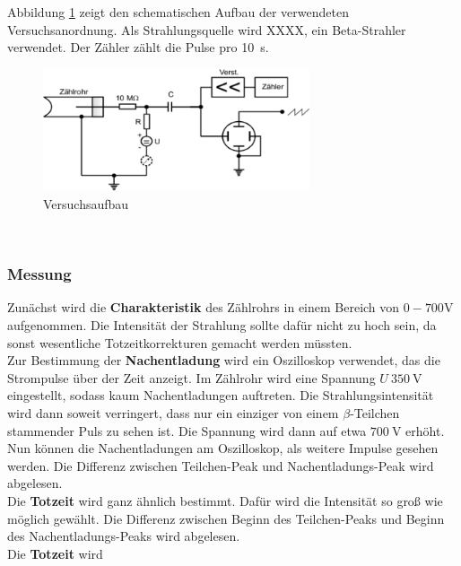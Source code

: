 Abbildung \ref{fig:Versuchsaufbau} zeigt den schematischen Aufbau der verwendeten Versuchsanordnung. Als Strahlungsquelle wird XXXX, ein Beta-Strahler verwendet. Der Zähler zählt die Pulse pro \SI{10}{\second}.
\begin{figure}[h!]
	\centering
	\includegraphics[width=0.7\textwidth]{Versuchsaufbau.pdf}
	\caption{Versuchsaufbau}
	\label{fig:Versuchsaufbau}
\end{figure} \\
\subsubsection*{Messung}
Zunächst wird die \textbf{Charakteristik} des Zählrohrs in einem Bereich von $0-700$V aufgenommen. Die Intensität der Strahlung sollte dafür nicht zu hoch sein, da sonst wesentliche Totzeitkorrekturen gemacht werden müssten. \\
Zur Bestimmung der \textbf{Nachentladung} wird ein Oszilloskop verwendet, das die Strompulse über der Zeit anzeigt. Im Zählrohr wird eine Spannung $U~\SI{350}{\volt}$ eingestellt, sodass kaum Nachentladungen auftreten. Die Strahlungsintensität wird dann soweit verringert, dass nur ein einziger von einem $\beta$-Teilchen stammender Puls zu sehen ist. Die Spannung wird dann auf etwa $\SI{700}{\volt}$ erhöht. Nun können die Nachentladungen am Oszilloskop, als weitere Impulse gesehen werden. Die Differenz zwischen Teilchen-Peak und Nachentladungs-Peak wird abgelesen. \\
Die \textbf{Totzeit} wird ganz ähnlich bestimmt. Dafür wird die Intensität so groß wie möglich gewählt. Die Differenz zwischen Beginn des Teilchen-Peaks und Beginn des Nachentladungs-Peaks wird abgelesen. \\
Die \textbf{Totzeit} wird 